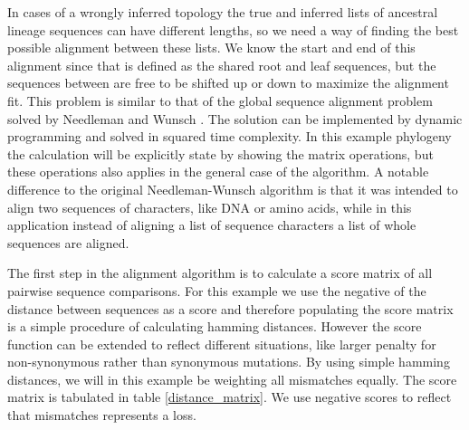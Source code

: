 \fi


In cases of a wrongly inferred topology the true and inferred lists of ancestral lineage sequences can have different lengths, so we need a way of finding the best possible alignment between these lists.
We know the start and end of this alignment since that is defined as the shared root and leaf sequences, but the sequences between are free to be shifted up or down to maximize the alignment fit.
This problem is similar to that of the global sequence alignment problem solved by Needleman and Wunsch \cite{needleman1970general}.
The solution can be implemented by dynamic programming and solved in squared time complexity.
In this example phylogeny the calculation will be explicitly state by showing the matrix operations, but these operations also applies in the general case of the algorithm.
A notable difference to the original Needleman-Wunsch algorithm is that it was intended to align two sequences of characters, like DNA or amino acids, while in this application instead of aligning a list of sequence characters a list of whole sequences are aligned.

The first step in the alignment algorithm is to calculate a score matrix of all pairwise sequence comparisons.
For this example we use the negative of the distance between sequences as a score and therefore populating the score matrix is a simple procedure of calculating hamming distances.
However the score function can be extended to reflect different situations, like larger penalty for non-synonymous rather than synonymous mutations.
By using simple hamming distances, we will in this example be weighting all mismatches equally.
The score matrix is tabulated in table \ref{distance_matrix}.
We use negative scores to reflect that mismatches represents a loss.

